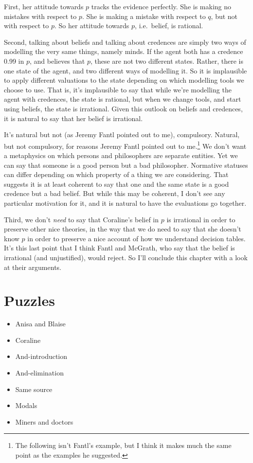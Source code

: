 \documentclass[11pt,]{book}
\providecommand{\tightlist}{%
  \setlength{\itemsep}{0pt}\setlength{\parskip}{0pt}}
\let\rmarkdownfootnote\footnote%
\def\footnote{\protect\rmarkdownfootnote}
\begin{document}
First, her attitude towards \(p\) tracks the evidence perfectly. She is making no mistakes with respect to \(p\). She is making a mistake with respect to \(q\), but not with respect to \(p\). So her attitude towards
\(p\), i.e.~belief, is rational.

Second, talking about beliefs and talking about credences are simply two ways of modelling the very same things, namely minds. If the agent both has a credence 0.99 in \(p\), and believes that \(p\), these are not two different states. Rather, there is one state of the agent, and two different ways of modelling it. So it is implausible to apply different valuations to the state depending on which modelling tools we choose to use. That is, it's implausible to say that while we're modelling the
agent with credences, the state is rational, but when we change tools, and start using beliefs, the state is irrational. Given this outlook on
beliefs and credences, it is natural to say that her belief is irrational.

It's natural but not (as Jeremy Fantl pointed out to me), compulsory. Natural, but not compulsory, for reasons Jeremy Fantl pointed
out to me.\footnote{The following isn't Fantl's example, but I think it makes much the same point as the examples he suggested.} We don't want a metaphysics on which persons and philosophers are separate entities. Yet we can say that someone is a good person but a bad philosopher. Normative statuses can differ depending on which property of a thing we are considering. That suggests it is at least coherent to say that one and the same state is a good credence but a bad belief. But while this may be coherent, I don't see any particular motivation for it, and it is natural to have the evaluations go together.

Third, we don't \emph{need} to say that Coraline's belief in \(p\) is irrational in order to preserve other nice theories, in the way that we do need to say that she doesn't know \(p\) in order to preserve a nice
account of how we understand decision tables. It's this last point that I think Fantl and McGrath, who say that the belief is irrational (and unjustified), would reject. So I'll conclude this chapter with a look at their arguments.

\hypertarget{puzzles}{%
\section{Puzzles}\label{puzzles}}

\begin{itemize}
\tightlist
\item
  Anisa and Blaise
\item
  Coraline
\item
  And-introduction
\item
  And-elimination
\item
  Same source
\item
  Modals
\item
  Miners and doctors
\end{itemize}
\end{document}
